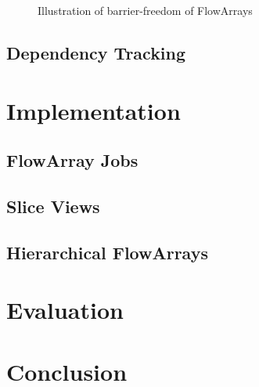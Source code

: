 \documentclass[runningheads,a4paper,fleqn]{llncs}
\begin{document}
\begin{figure}
  \caption{Illustration of barrier-freedom of FlowArrays}
  \label{fig:barrier-free}
\end{figure}

\subsection{Dependency Tracking}


\section{Implementation}
\label{sec:implementation}

\subsection{FlowArray Jobs}

\subsection{Slice Views}

\subsection{Hierarchical FlowArrays}

\section{Evaluation}
\label{sec:evaluation}

\section{Conclusion}



\end{document}
